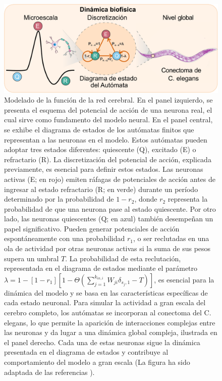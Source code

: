 \begin{figure}[h!]
	\centering\includegraphics[width=\imsize]{modelo}
	\caption[Modelado de la función de la red cerebral.]{ Modelado de la función de la red cerebral. En el panel izquierdo, se presenta el esquema del potencial de acción de una neurona real, el cual sirve como fundamento del modelo neural. En el panel central, se exhibe el diagrama de estados de los autómatas finitos que representan a las neuronas en el modelo. Estos autómatas pueden adoptar tres estados diferentes: quiescente (Q), excitado (E) o refractario (R). La discretización del potencial de acción, explicada previamente, es esencial para definir estos estados. Las neuronas activas (E; en rojo) emiten ráfagas de potenciales de acción antes de ingresar al estado refractario (R; en verde) durante un período determinado por la probabilidad de $1-r_2$, donde $r_2$ representa la probabilidad de que una neurona pase al estado quiescente. Por otro lado, las neuronas quiescentes (Q; en azul) también desempeñan un papel significativo. Pueden generar potenciales de acción espontáneamente con una probabilidad $r_1$, o ser reclutadas en una ola de actividad por otras neuronas activas si la suma de sus pesos supera un umbral $T$. La probabilidad de esta reclutación, representada en el diagrama de estados mediante el parámetro $\lambda=1-\left[1-r_1\right]\left[1-\Theta\left(\sum_{j=1}^{k_{in,i}}W_{ji}\delta_{s_j,1}-T\right)\right]$, es esencial para la dinámica del modelo y se basa en las características específicas de cada estado neuronal. Para simular la actividad a gran escala del cerebro completo, los autómatas se incorporan al conectoma del C. elegans, lo que permite la aparición de interacciones complejas entre las neuronas y da lugar a una dinámica global compleja, ilustrada en el panel derecho. Cada una de estas neuronas sigue la dinámica presentada en el diagrama de estados y contribuye al comportamiento del modelo a gran escala (La figura ha sido adaptada de las referencias \cite{lynn_physics_2019, jjfroehlich_english_2022}).}\label{fig:spikeautomata}
\end{figure}


